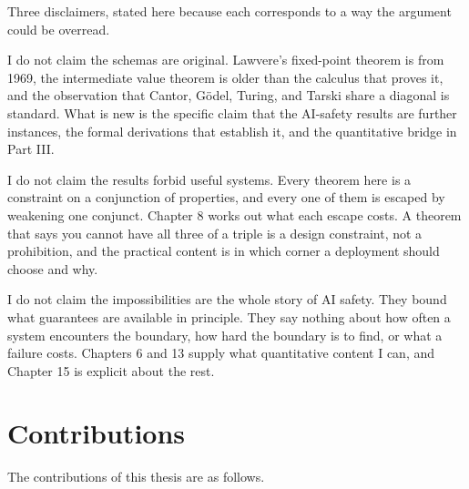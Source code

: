 \documentclass{memoir}
\begin{document}
Three disclaimers, stated here because each corresponds to a way the argument
could be overread.

I do not claim the schemas are original. Lawvere's fixed-point theorem is from
1969, the intermediate value theorem is older than the calculus that proves it,
and the observation that Cantor, Gödel, Turing, and Tarski share a diagonal is
standard. What is new is the specific claim that the AI-safety results are
further instances, the formal derivations that establish it, and the
quantitative bridge in Part III.

I do not claim the results forbid useful systems. Every theorem here is a
constraint on a conjunction of properties, and every one of them is escaped by
weakening one conjunct. Chapter 8 works out what each escape costs. A theorem
that says you cannot have all three of a triple is a design constraint, not a
prohibition, and the practical content is in which corner a deployment should
choose and why.

I do not claim the impossibilities are the whole story of AI safety. They bound
what guarantees are available in principle. They say nothing about how often a
system encounters the boundary, how hard the boundary is to find, or what a
failure costs. Chapters 6 and 13 supply what quantitative content I can, and
Chapter 15 is explicit about the rest.



\section{Contributions}\label{Two--Schemas--of--Impossibility-005F-005F-005F--Machine--Checked--Limits--of--Trustworthy--Machine--Learning-005F-005F-005F--and--Why--They--Tighten--with--Capability----Introduction----Contributions}

The contributions of this thesis are as follows.
\end{document}
